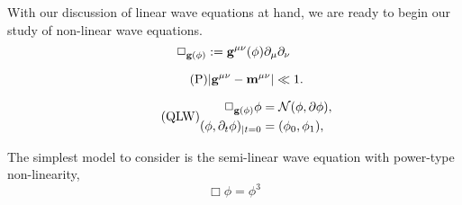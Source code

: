 
With our discussion of linear wave equations at hand, we are ready to begin our study of non-linear wave equations. 
    \[
        \Box_{{\bf g}(\phi)} := {\bf g}^{\mu \nu} (\phi) \partial_\mu \partial_\nu
    \]

    \begin{equation}\tag{P}\label{eq:perturb}
        | {\bf g}^{\mu \nu} - {\bf m}^{\mu \nu} |
            \ll 1. 
    \end{equation}


\begin{equation}\label{eq:QLW}\tag{QLW}
	\begin{split}
		\Box_{{\bf g}(\phi)} \phi 
			&= \mathcal N(\phi, \partial\phi), \\
		(\phi, \partial_t \phi)_{|t = 0}
			&= (\phi_0, \phi_1),
	\end{split}
\end{equation}


The simplest model to consider is the semi-linear wave equation with power-type non-linearity,
    \[
        \Box \phi 
            = \phi^3
    \]


